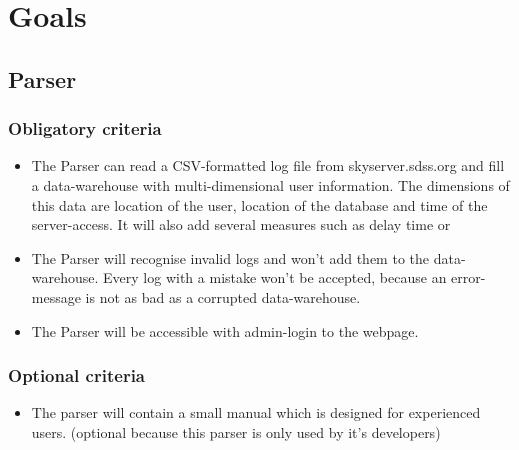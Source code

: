 \section{Goals}


\subsection{Parser}


\subsubsection{Obligatory criteria} %
\begin{itemize}
\item The Parser can read a CSV-formatted log file from skyserver.sdss.org
 and fill a data-warehouse with multi-dimensional user information.
 The dimensions of this data are location of the user, location of the 
 database and time of the server-access. It will also add several measures such as delay time or  
\item The Parser will recognise invalid logs and won't add them to the data-warehouse.
 Every log with a mistake won't be accepted, because an error-message is not 
 as bad as a corrupted data-warehouse. 
\item The Parser will be accessible with admin-login to the webpage.
\end{itemize}

\subsubsection{Optional criteria}
\begin{itemize}
\item The parser will contain a small manual which is designed for experienced users. (optional because this parser is
only used by it's developers)
\end{itemize}

